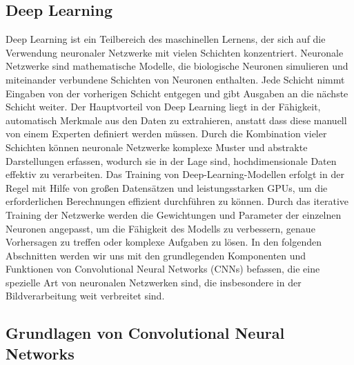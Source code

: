 \subsection{Deep Learning}

    Deep Learning ist ein Teilbereich des maschinellen Lernens, der sich auf die Verwendung neuronaler Netzwerke mit vielen Schichten konzentriert. 
    Neuronale Netzwerke sind mathematische Modelle, die biologische Neuronen simulieren und miteinander verbundene Schichten von Neuronen enthalten. 
    Jede Schicht nimmt Eingaben von der vorherigen Schicht entgegen und gibt Ausgaben an die nächste Schicht weiter.
    Der Hauptvorteil von Deep Learning liegt in der Fähigkeit, automatisch Merkmale aus den Daten zu extrahieren, anstatt dass diese manuell von einem Experten definiert werden müssen. 
    Durch die Kombination vieler Schichten können neuronale Netzwerke komplexe Muster und abstrakte Darstellungen erfassen, wodurch sie in der Lage sind, hochdimensionale Daten effektiv zu verarbeiten.
    Das Training von Deep-Learning-Modellen erfolgt in der Regel mit Hilfe von großen Datensätzen und leistungsstarken GPUs, um die erforderlichen Berechnungen effizient durchführen zu können. 
    Durch das iterative Training der Netzwerke werden die Gewichtungen und Parameter der einzelnen Neuronen angepasst, um die Fähigkeit des Modells zu verbessern, genaue Vorhersagen zu treffen oder komplexe Aufgaben zu lösen.
    In den folgenden Abschnitten werden wir uns mit den grundlegenden Komponenten und Funktionen von Convolutional Neural Networks (CNNs) befassen, die eine spezielle Art von neuronalen Netzwerken sind, die insbesondere in der Bildverarbeitung weit verbreitet sind.

\subsection{Grundlagen von Convolutional Neural Networks}

